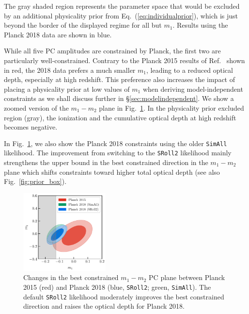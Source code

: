 \documentclass[prd,twocolumn,amsmath,amssymb,floatfix,superscriptaddress,nofootinbib]{revtex4-1}
\newcommand{\wh}[1]{\textcolor{blue}{#1}}
\begin{document}
%
%
%
%
The gray shaded region 
represents the parameter space that would be excluded by an additional 
physicality prior from Eq.~(\ref{eq:individualprior}),
which is just beyond the border of the displayed regime for all but $m_1$. Results using the Planck 2018 data are shown in blue. 

While all five PC amplitudes are  constrained by Planck, the first two are particularly well-constrained. Contrary to the Planck 2015 results of Ref.~\cite{Heinrich:2016ojb} shown in red, the 2018 data prefers a much smaller $m_1$, leading to a reduced optical depth, especially at high redshift.  
This preference also increases the impact of placing a physicality prior at low values of $m_1$ when deriving model-independent constraints as we shall discuss further in \S \ref{sec:modelindependent}.
We show a zoomed version of the $m_1-m_2$ plane in Fig.~\ref{fig:plot_m1m2_2015_vs_2018}.
In the physicality prior excluded region (gray), the ionization and the cumulative optical depth at high redshift becomes negative.

In Fig.~\ref{fig:plot_m1m2_2015_vs_2018}, we also show
the Planck 2018 constraints using the older \texttt{SimAll} likelihood.  The improvement 
from switching to the \texttt{SRoll2} likelihood mainly strengthens the upper bound in the best constrained direction in the $m_1-m_2$ plane which shifts constraints toward higher total optical depth (see also Fig.~\ref{fig:prior_box}).


\begin{figure}
\includegraphics[width=0.4\textwidth]{plots/plot_m1_m2_t18_r12_t19_t20_vs_pl18_pc_zmax30_pliklite_0930_vs_pl18_pc_zmax30_pliklite_srollv2_1015.pdf}
\caption{Changes in the best constrained $m_1-m_2$ PC plane between Planck 2015 (red) and Planck 2018 (blue,  \texttt{SRoll2}; green, \texttt{SimAll}). The default \texttt{SRoll2} likelihood moderately improves the best constrained direction  and raises the optical depth for Planck 2018.}
\label{fig:plot_m1m2_2015_vs_2018}
\end{figure}
\end{document}
